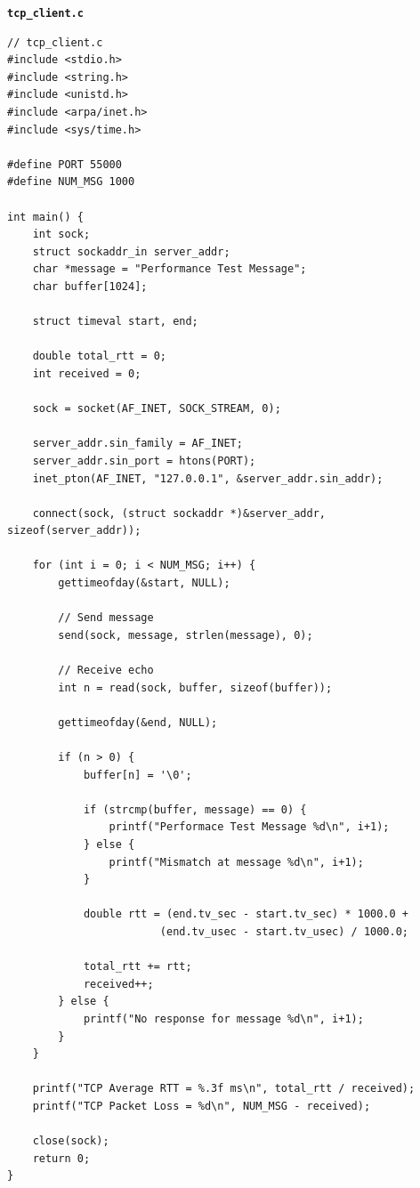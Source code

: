 \documentclass[a4paper,12pt]{article}
\begin{document}
\noindent
\textbf{\texttt{tcp\_client.c}}
\begin{lstlisting}
// tcp_client.c
#include <stdio.h>
#include <string.h>
#include <unistd.h>
#include <arpa/inet.h>
#include <sys/time.h>

#define PORT 55000
#define NUM_MSG 1000

int main() {
    int sock;
    struct sockaddr_in server_addr;
    char *message = "Performance Test Message";
    char buffer[1024];

    struct timeval start, end;

    double total_rtt = 0;
    int received = 0;

    sock = socket(AF_INET, SOCK_STREAM, 0);

    server_addr.sin_family = AF_INET;
    server_addr.sin_port = htons(PORT);
    inet_pton(AF_INET, "127.0.0.1", &server_addr.sin_addr);

    connect(sock, (struct sockaddr *)&server_addr, sizeof(server_addr));

    for (int i = 0; i < NUM_MSG; i++) {
        gettimeofday(&start, NULL);

        // Send message
        send(sock, message, strlen(message), 0);

        // Receive echo
        int n = read(sock, buffer, sizeof(buffer));

        gettimeofday(&end, NULL);

        if (n > 0) {
            buffer[n] = '\0';

            if (strcmp(buffer, message) == 0) {
                printf("Performace Test Message %d\n", i+1);
            } else {
                printf("Mismatch at message %d\n", i+1);
            }

            double rtt = (end.tv_sec - start.tv_sec) * 1000.0 +
                        (end.tv_usec - start.tv_usec) / 1000.0;

            total_rtt += rtt;
            received++;
        } else {
            printf("No response for message %d\n", i+1);
        }
    }

    printf("TCP Average RTT = %.3f ms\n", total_rtt / received);
    printf("TCP Packet Loss = %d\n", NUM_MSG - received);

    close(sock);
    return 0;
}
\end{lstlisting}
\end{document}
